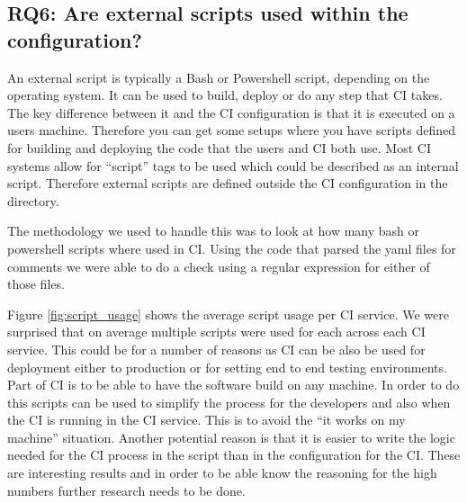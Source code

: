 \documentclass[10pt,conference]{IEEEtran}
\begin{document}
\pagebreak

\vspace*{-0.05in}
\subsection{\textbf{RQ6}: Are external scripts used within the configuration?}
\label{section:RQ6}
\vspace*{-0.05in}

An external script is typically a Bash or Powershell script, depending on the operating system. It can be used to build, deploy or do any step that CI takes. The key difference between it and the CI configuration is that it is executed on a users machine. Therefore you can get some setups where you have scripts defined for building and deploying the code that the users and CI both use. Most CI systems allow for \enquote{script} tags to be used which could be described as an internal script. Therefore external scripts are defined outside the CI configuration in the directory.

The methodology we used to handle this was to look at how many bash or powershell scripts where used in CI. Using the code that parsed the yaml files for comments we were able to do a check using a regular expression for either of those files.  

Figure \ref{fig:script_usage} shows the average script usage per CI service. We were surprised that on average multiple scripts were used for each across each CI service. This could be for a number of reasons as CI can be also be used for deployment either to production or for setting end to end testing environments. Part of CI is to be able to have the software build on any machine. In order to do this scripts can be used to simplify the process for the developers and also when the CI is running in the CI service. This is to avoid the \enquote{it works on my machine} situation.
Another potential reason is that it is easier to write the logic needed for the CI process in the script than in the configuration for the CI. 
These are interesting results and in order to be able know the reasoning for the high numbers further research needs to be done.
\end{document}
